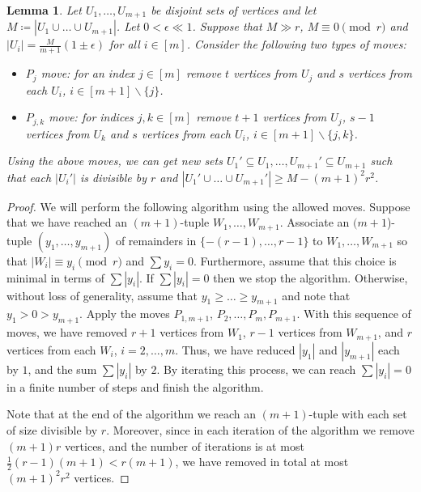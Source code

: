 \documentclass[reqno, 12pt]{amsart}
\numberwithin{equation}{section}
\numberwithin{figure}{section}
\theoremstyle{plain}
\newtheorem{lemma}[thm]{Lemma}
\theoremstyle{definition}
\let\setminus=\smallsetminus
\begin{document}
     \begin{lemma}\label{l:absorber-divisibility-by-r}
         Let $U_1,\dots  , U_{m+1}$ be disjoint sets of vertices and let $M\coloneq |U_1\cup\dots\cup  U_{m+1}|$. Let $0<\epsilon \ll 1 $. Suppose that $M\gg r$,  $M \equiv 0 \pmod{r}$ and $|U_i|=\frac{M}{m+1}(1\pm\epsilon)$ for all $i\in [m]$.
        Consider the following two types of moves:
        \begin{itemize}
            \item $P_j$ move: for an index $j\in [m]$ remove $t$ vertices from $U_j$ and $s$ vertices from each $U_i$, $i\in[m+1]\setminus\{j\}$.
            \item $P_{j,k}$ move: for indices $j,k \in [m]$ remove $t+1$ vertices from $U_j$, $s-1$ vertices from $U_k$ and $s$ vertices from each $U_i$, $i\in[m+1]\setminus\{j,k\}$.
            \end{itemize} 
        Using the above moves, we can get new sets $U_1'\subseteq U_1,\dots,U_{m+1}'\subseteq U_{m+1}$ such that each $|U_i'|$ is divisible by $r$ and $|U_1'\cup\dots\cup U_{m+1}'|\geq M -(m+1)^2r^2$.
     \end{lemma}

    \begin{proof}
        We will perform the following algorithm using the allowed moves. Suppose that we have reached an $(m+1)$-tuple $W_1,\dots,W_{m+1}$. Associate an $(m+1$)-tuple $(y_1,\dots,y_{m+1})$ of remainders in $\{-(r-1),\dots,r-1\}$ to $W_1,\dots, W_{m+1}$ so that $|W_i|\equiv y_i \pmod r$ and $\sum y_i=0$. Furthermore, assume that this choice is minimal in terms of $\sum |y_i|$. If $\sum|y_i|=0$ then we stop the algorithm. Otherwise, without loss of generality, assume that $y_1\geq \dots \geq y_{m+1}$ and note that $y_1>0>y_{m+1}$. Apply the moves $P_{1,m+1}$, $P_2,\dots ,P_m,P_{m+1}$. With this sequence of moves, we have removed $r+1$ vertices from $W_1$, $r-1$ vertices from $W_{m+1}$, and $r$ vertices from each $W_i$, $i=2,\dots ,m$. Thus, we have reduced $|y_1|$ and $|y_{m+1}|$ each by $1$, and the sum $\sum |y_i|$ by $2$. By iterating this process, we can reach $\sum |y_i|=0$ in a finite number of steps and finish the algorithm.

        Note that at the end of the algorithm we reach an $(m+1)$-tuple with each set of size divisible by $r$.
        Moreover, since in each iteration of the algorithm we remove $(m+1)r$ vertices, and the number of iterations is at most $\frac12(r-1)(m+1)<r(m+1)$, we have removed in total at most $(m+1)^2r^2$ vertices. 
    \end{proof} 
\end{document}
